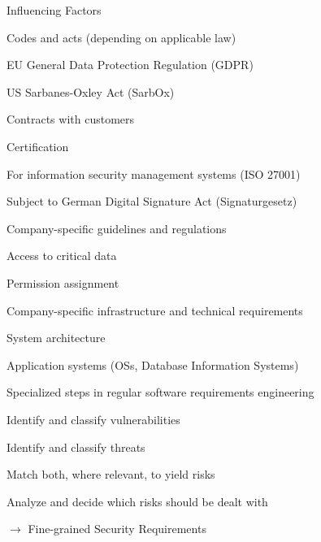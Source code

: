 \documentclass[a4paper]{article}
\begin{document}
\begin{multicols}{3}
    Influencing Factors
    \begin{itemize*}
        \item Codes and acts (depending on applicable law)
        \begin{itemize*}
            \item EU General Data Protection Regulation (GDPR)
            \item US Sarbanes-Oxley Act (SarbOx)
        \end{itemize*}
        \item Contracts with customers
        \item Certification
        \begin{itemize*}
            \item For information security management systems (ISO 27001)
            \item Subject to German Digital Signature Act (Signaturgesetz)
        \end{itemize*}
        \item Company-specific guidelines and regulations
        \begin{itemize*}
            \item Access to critical data
            \item Permission assignment
        \end{itemize*}
        \item Company-specific infrastructure and technical requirements
        \begin{itemize*}
            \item System architecture
            \item Application systems (OSs, Database Information Systems)
        \end{itemize*}
    \end{itemize*}

    \begin{multicols}{2}
        Specialized steps in regular software requirements engineering
        \begin{enumerate*}
            \item Identify and classify vulnerabilities
            \item Identify and classify threats
            \item Match both, where relevant, to yield risks
            \item Analyze and decide which risks should be dealt with
            \item[$\rightarrow$] Fine-grained Security Requirements
        \end{enumerate*}
        \columnbreak


\end{multicols}
\end{multicols}
\end{document}
